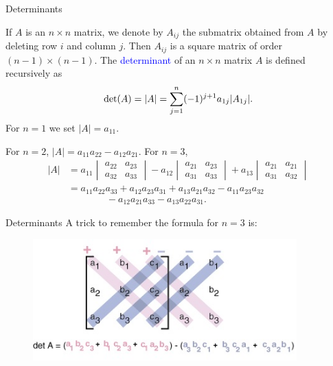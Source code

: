 \documentclass[11pt,aspectratio=169]{beamer}
\begin{document}
\begin{frame}{Determinants}

If $A$ is an $n \times n$ matrix, we denote by $A_{ij}$ the submatrix obtained from $A$ by deleting row $i$ and column $j$. Then $A_{ij}$ is a square matrix of order $(n-1) \times (n-1)$.
\vskip 12pt
 The \textcolor{blue}{determinant} of an $n \times n$ matrix $A$ is defined recursively as
\begin{equation*}
\textnormal{det}(A)=\vert A \vert=\sum_{j=1}^n (-1)^{j+1} a_{1j} \vert A_{1j} \vert.
\end{equation*}
For $n=1$ we set $\vert A \vert=a_{11}$.

\vskip 12pt
 For  $n=2$, $\vert A \vert=a_{11}a_{22}-a_{12} a_{21}$.
\vskip 12pt
For $n=3$,
\begin{equation*} \begin{split}
\vert A \vert&=a_{11} \begin{vmatrix}
a_{22}& a_{23}\\
a_{32}& a_{33}
\end{vmatrix}-a_{12}\begin{vmatrix}
a_{21}& a_{23}\\
a_{31}& a_{33}
\end{vmatrix} +a_{13} \begin{vmatrix}
a_{21}& a_{21}\\
a_{31}& a_{32}
\end{vmatrix}\\
&=a_{11} a_{22} a_{33}+a_{12}a_{23} a_{31}+a_{13} a_{21} a_{32}-a_{11} a_{23}a_{32}\\
&\qquad \qquad -a_{12} a_{21} a_{33}-a_{13}a_{22} a_{31}.
\end{split}
\end{equation*}
\end{frame}

\begin{frame}{Determinants}
A trick to remember the formula for $n=3$ is:
\begin{figure}
\includegraphics[width=4in]{img/deter} 
\end{figure}
\end{frame}
\end{document}
